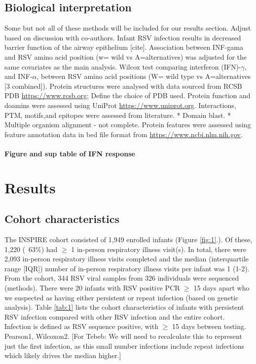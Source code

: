 \documentclass{article}
\begin{document}
\subsection{Biological interpretation}
Some but not all of these methods will be included for our results section. 
Adjust based on discussion with co-authors.
Infant RSV infection results in decreased barrier function of the airway epithelium [cite].
Association between INF-gama and RSV amino acid position (w= wild vs A=alternatives) was adjusted for the same covariates as the main analysis. Wilcox test comparing interferon (IFN)-$\gamma$, and INF-$\alpha$, between RSV amino acid positions (W= wild type vs A=alternatives [3 combined]).
Protein structures were analysed with data sourced from 
RCSB PDB \url{https://www.rcsb.org}; Define the choice of PDB used. 
Protein function and doamins were assessed using 
UniProt	\url{https://www.uniprot.org}.
Interactions, PTM, motifs,and epitopes were assessed from literature. 
* Domain blast. 
* Multiple organism alignment - not complete.
Protein features were assessed using feature annotation data in bed file format from 
\url{https://www.ncbi.nlm.nih.gov}.
\paragraph{Figure and sup table of IFN response}

\section{Results}
\subsection{Cohort characteristics}
The INSPIRE cohort consisted of 1,949 enrolled infants 
(Figure \ref{fig:1}.).
Of these, 1,220 (~63\%) had $\ge$ 1 in-person respiratory illness visit(s). 
In total, there were 2,093 in-person respiratory illness visits completed and the median (interquartile range [IQR]) number of in-person respiratory illness visits per infant was 1 (1-2). 
From the cohort, 344 RSV viral samples from 326 individuals were sequenced (methods).
There were 20 infants with RSV positive PCR $\ge$ 15 days apart who we suspected as having either persistent or repeat infection (based on genetic analysis).
Table \ref{tab:1} lists the cohort characteristics of infants with persistent RSV infection compared with other RSV infection and the entire cohort. 
Infection is defined as RSV sequence positive, with $\ge$ 15 days between testing. Pearson1, Wilcoxon2.
[For Tebeb: We will need to recalculate this to represent just the first infection, as this small number infections include repeat infections which likely drives the median higher.]
\end{document}
